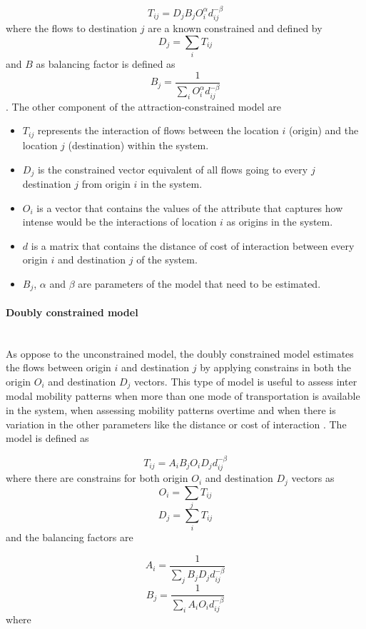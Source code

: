 \documentclass{article}
\begin{document}
\[T_{ij} = D_j B_j O_i^\alpha d_{ij}^{-\beta}\] where the flows to destination $j$ are a known constrained and defined by \[D_j = \sum_i T_{ij}\] and $B$ as balancing factor is defined as \[B_j = \frac{1}{\sum_i O_i^\alpha d_{ij}^{-\beta}}\]. The other component of the attraction-constrained model are

\begin{itemize}
  \item $T_{ij}$ represents the interaction of flows between the location $i$ (origin) and the location $j$ (destination) within the system. 
  \item $D_{j}$ is the constrained vector equivalent of all flows going to every $j$ destination $j$ from origin $i$ in the system.
  \item $O_{i}$ is a vector that contains the values of the attribute that captures how intense would be the interactions of location $i$ as origins in the system.
    \item $d$ is a matrix that contains the distance of cost of interaction between every origin $i$ and destination $j$ of the system.
    \item $B_{j}$, $\alpha$  and $\beta$ are parameters of the model that need to be estimated.
\end{itemize}


\paragraph{Doubly constrained model}\mbox{}\\

As oppose to the unconstrained model, the doubly constrained model estimates the flows between origin $i$ and destination $j$ by applying constrains in both the origin $O_{i}$ and destination $D_{j}$ vectors. This type of model is useful to assess inter modal mobility patterns when more than one mode of transportation is available in the system, when assessing mobility patterns overtime and when there is variation in the other parameters like the distance or cost of interaction \citep{wilkinsonSpatialInteractionModelling2023}. The model is defined as

\[T_{ij} = A_i B_j O_i D_j d_{ij}^{-\beta}\] where there are constrains for both origin $O_{i}$ and destination $D_{j}$ vectors as \[O_i = \sum_j T_{ij}\] \[D_j = \sum_i T_{ij} \] and the balancing factors are

\[A_i = \frac{1}{\sum_j B_j D_j d_{ij}^{-\beta}}\]
\[B_j = \frac{1}{\sum_i A_i O_i d_{ij}^{-\beta}}\] where 
\end{document}
